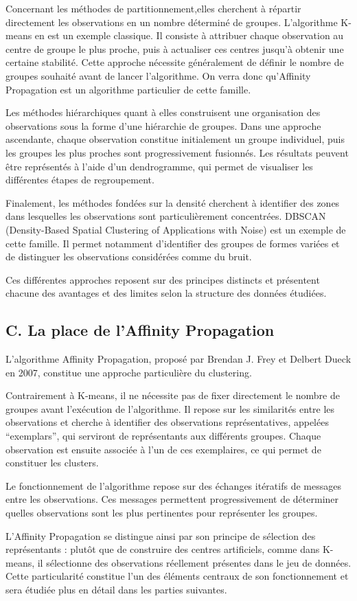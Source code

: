 \documentclass[
  letterpaper,
  DIV=11,
  numbers=noendperiod]{scrartcl}
\begin{document}
Concernant les méthodes de partitionnement,elles cherchent à répartir
directement les observations en un nombre déterminé de groupes.
L'algorithme K-means en est un exemple classique. Il consiste à
attribuer chaque observation au centre de groupe le plus proche, puis à
actualiser ces centres jusqu'à obtenir une certaine stabilité. Cette
approche nécessite généralement de définir le nombre de groupes souhaité
avant de lancer l'algorithme. On verra donc qu'Affinity Propagation est
un algorithme particulier de cette famille.

Les méthodes hiérarchiques quant à elles construisent une organisation
des observations sous la forme d'une hiérarchie de groupes. Dans une
approche ascendante, chaque observation constitue initialement un groupe
individuel, puis les groupes les plus proches sont progressivement
fusionnés. Les résultats peuvent être représentés à l'aide d'un
dendrogramme, qui permet de visualiser les différentes étapes de
regroupement.

Finalement, les méthodes fondées sur la densité cherchent à identifier
des zones dans lesquelles les observations sont particulièrement
concentrées. DBSCAN (Density-Based Spatial Clustering of Applications
with Noise) est un exemple de cette famille. Il permet notamment
d'identifier des groupes de formes variées et de distinguer les
observations considérées comme du bruit.

Ces différentes approches reposent sur des principes distincts et
présentent chacune des avantages et des limites selon la structure des
données étudiées.

\subsection{C. La place de l'Affinity
Propagation}\label{c.-la-place-de-laffinity-propagation}

L'algorithme Affinity Propagation, proposé par Brendan J. Frey et
Delbert Dueck en 2007, constitue une approche particulière du
clustering.

Contrairement à K-means, il ne nécessite pas de fixer directement le
nombre de groupes avant l'exécution de l'algorithme. Il repose sur les
similarités entre les observations et cherche à identifier des
observations représentatives, appelées ``exemplars'', qui serviront de
représentants aux différents groupes. Chaque observation est ensuite
associée à l'un de ces exemplaires, ce qui permet de constituer les
clusters.

Le fonctionnement de l'algorithme repose sur des échanges itératifs de
messages entre les observations. Ces messages permettent progressivement
de déterminer quelles observations sont les plus pertinentes pour
représenter les groupes.

L'Affinity Propagation se distingue ainsi par son principe de sélection
des représentants : plutôt que de construire des centres artificiels,
comme dans K-means, il sélectionne des observations réellement présentes
dans le jeu de données. Cette particularité constitue l'un des éléments
centraux de son fonctionnement et sera étudiée plus en détail dans les
parties suivantes.
\end{document}
